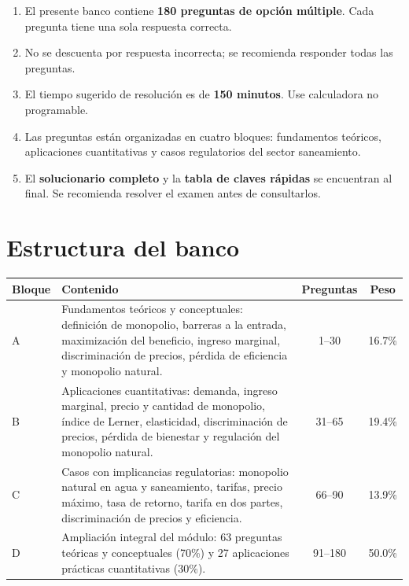\documentclass[11pt,a4paper]{article}
\begin{document}
\begin{enumerate}[label=\arabic*.,leftmargin=1.6em,itemsep=3pt]
  \item El presente banco contiene \textbf{180 preguntas de opción múltiple}. Cada pregunta tiene una sola respuesta correcta.
  \item No se descuenta por respuesta incorrecta; se recomienda responder todas las preguntas.
  \item El tiempo sugerido de resolución es de \textbf{150 minutos}. Use calculadora no programable.
  \item Las preguntas están organizadas en cuatro bloques: fundamentos teóricos, aplicaciones cuantitativas y casos regulatorios del sector saneamiento.
  \item El \textbf{solucionario completo} y la \textbf{tabla de claves rápidas} se encuentran al final. Se recomienda resolver el examen antes de consultarlos.
\end{enumerate}

\section*{Estructura del banco}

\begin{center}
\renewcommand{\arraystretch}{1.25}
\begin{tabular}{@{}p{1.4cm}>{\raggedright\arraybackslash}p{7.6cm}cc@{}}
\toprule
\textbf{Bloque} & \textbf{Contenido} & \textbf{Preguntas} & \textbf{Peso} \\
\midrule
A & Fundamentos teóricos y conceptuales: definición de monopolio, barreras a la entrada, maximización del beneficio, ingreso marginal, discriminación de precios, pérdida de eficiencia y monopolio natural. & 1--30 & 16.7\% \\
B & Aplicaciones cuantitativas: demanda, ingreso marginal, precio y cantidad de monopolio, índice de Lerner, elasticidad, discriminación de precios, pérdida de bienestar y regulación del monopolio natural. & 31--65 & 19.4\% \\
C & Casos con implicancias regulatorias: monopolio natural en agua y saneamiento, tarifas, precio máximo, tasa de retorno, tarifa en dos partes, discriminación de precios y eficiencia. & 66--90 & 13.9\% \\
D & Ampliación integral del módulo: 63 preguntas teóricas y conceptuales (70\%) y 27 aplicaciones prácticas cuantitativas (30\%). & 91--180 & 50.0\% \\
\bottomrule
\end{tabular}
\end{center}
\end{document}
